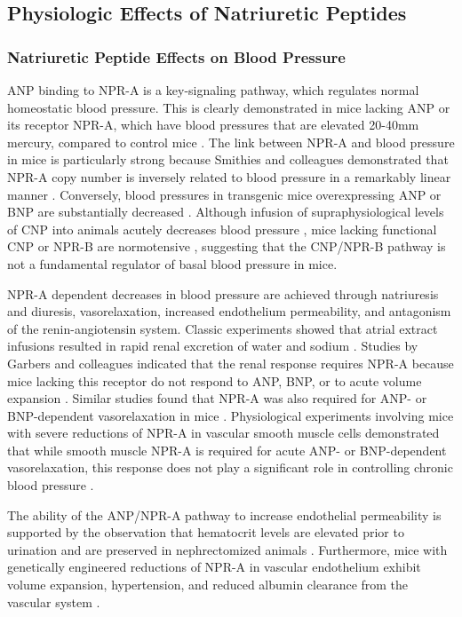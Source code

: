 \documentclass[14pt,a4paper,onecolumn]{extarticle}
\begin{document}
\subsection{Physiologic Effects of Natriuretic Peptides}


\subsubsection{Natriuretic Peptide Effects on Blood Pressure}
ANP binding to NPR-A is a key-signaling pathway, which regulates normal homeostatic blood pressure. This is clearly demonstrated in mice lacking ANP or its receptor NPR-A, which have blood pressures that are elevated 20-40mm mercury, compared to control mice \citep{John1995} \citep{John1996} \citep{Lopez1995} \citep{Oliver1997}.
The link between NPR-A and blood pressure in mice is particularly strong because Smithies and colleagues demonstrated that NPR-A copy number is inversely related to blood pressure in a  remarkably linear manner \citep{Oliver1998}.
Conversely, blood pressures in transgenic mice overexpressing ANP or BNP are substantially decreased \citep{Ogawa1994a} \citep{Steinhelper1990}. Although infusion of supraphysiological levels of CNP into animals acutely decreases blood pressure \citep{Clavell1993} \citep{Sudoh1990}, mice lacking functional CNP or NPR-B are normotensive \citep{Chusho2001} \citep{Tamura2004}, suggesting that the CNP/NPR-B pathway is not a fundamental regulator of basal blood pressure in mice.

NPR-A dependent decreases in blood pressure are achieved through natriuresis and diuresis, vasorelaxation, increased endothelium permeability, and antagonism of the renin-angiotensin system. Classic experiments showed that atrial extract infusions resulted in rapid renal excretion of water and sodium \citep{deBold1981}. Studies by Garbers and colleagues indicated that the renal response requires NPR-A because mice lacking this receptor do not respond to ANP, BNP, or to acute volume expansion \citep{Kishimoto1996}. Similar studies found that NPR-A was also required for ANP- or BNP-dependent vasorelaxation in mice \citep{Lopez1997}. Physiological experiments involving mice with severe reductions of NPR-A in vascular smooth muscle cells demonstrated that while smooth muscle NPR-A is required for acute ANP- or BNP-dependent vasorelaxation, this response does not play a significant role in controlling chronic blood pressure \citep{Holtwick2002}.

The ability of the ANP/NPR-A pathway to increase  endothelial permeability is supported by the observation that hematocrit levels are elevated prior to urination and are preserved in nephrectomized animals \citep{Almeida1986} \citep{Fluckiger1986} \citep{Richards1988}.
 Furthermore, mice with genetically engineered reductions of NPR-A in vascular endothelium exhibit volume expansion, hypertension, and reduced albumin clearance from the vascular system \citep{Sabrane2005}.
\end{document}
